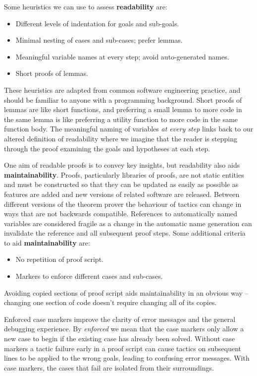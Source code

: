 \documentclass[]{unswthesis}
\let\i\textit
\let\b\textbf
\begin{document}
Some heuristics we can use to assess \b{readability} are:

\begin{itemize}
\item Different levels of indentation for goals and sub-goals.
\item Minimal nesting of cases and sub-cases; prefer lemmas.
\item Meaningful variable names at every step; avoid auto-generated names.
\item Short proofs of lemmas.
\end{itemize}

These heuristics are adapted from common software engineering practice, and should be familiar to anyone with a programming background. Short proofs of lemmas are like short functions, and preferring a small lemma to more code in the same lemma is like preferring a utility function to more code in the same function body. The meaningful naming of variables \i{at every step} links back to our altered definition of readability where we imagine that the reader is stepping through the proof examining the goals and hypotheses at each step.

One aim of readable proofs is to convey key insights, but readability also aids \b{maintainability}. Proofs, particularly libraries of proofs, are not static entities and must be constructed so that they can be updated as easily as possible as features are added and new versions of related software are released. Between different versions of the theorem prover the behaviour of tactics can change in ways that are not backwards compatible. References to automatically named variables are considered fragile as a change in the automatic name generation can invalidate the reference and all subsequent proof steps. Some additional criteria to aid \b{maintainability} are:

\begin{itemize}
\item No repetition of proof script.
\item Markers to enforce different cases and sub-cases.
\end{itemize}

Avoiding copied sections of proof script aids maintainability in an obvious way -- changing one section of code doesn't require changing all of its copies.

Enforced case markers improve the clarity of error messages and the general debugging experience. By \i{enforced} we mean that the case markers only allow a new case to begin if the existing case has already been solved. Without case markers a tactic failure early in a proof script can cause tactics on subsequent lines to be applied to the wrong goals, leading to confusing error messages. With case markers, the cases that fail are isolated from their surroundings.
\end{document}
